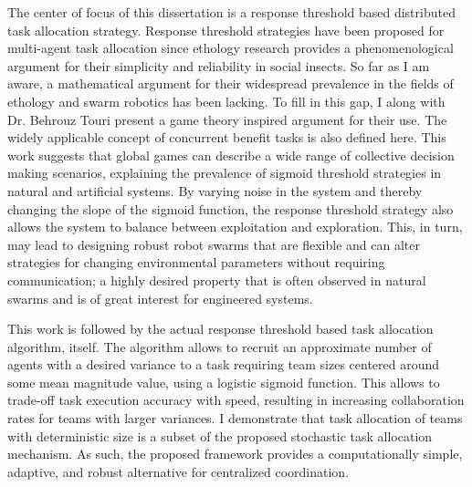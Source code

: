 \documentclass[12pt]{book}
\begin{document}
The center of focus of this dissertation is a response threshold based distributed task allocation strategy. Response threshold strategies have been proposed for multi-agent task allocation since ethology research \cite{Bonabeau1996, Bonabeau1997, Bonabeau1998} provides a phenomenological argument for their simplicity and reliability in social insects. So far as I am aware, a mathematical argument for their widespread prevalence in the fields of ethology and swarm robotics has been lacking. To fill in this gap, I along with Dr. Behrouz Touri present a game theory inspired argument for their use. The widely applicable concept of concurrent benefit tasks is also defined here. This work suggests that global games can describe a wide range of collective decision making scenarios, explaining the prevalence of sigmoid threshold strategies in natural and artificial systems. By varying noise in the system and thereby changing the slope of the sigmoid function, the response threshold strategy also allows the system to balance between exploitation and exploration. This, in turn, may lead to designing robust robot swarms that are flexible and can alter strategies for changing environmental parameters without requiring communication; a highly desired property that is often observed in natural swarms and is of great interest for engineered systems.

This work is followed by the actual response threshold based task allocation algorithm, itself. The algorithm allows to recruit an approximate number of agents with a desired variance to a task requiring team sizes centered around some mean magnitude value, using a logistic sigmoid function. This allows to trade-off task execution accuracy with speed, resulting in increasing collaboration rates for teams with larger variances. I demonstrate that task allocation of teams with deterministic size is a subset of the proposed stochastic task allocation mechanism. As such, the proposed framework provides a computationally simple, adaptive, and robust alternative for centralized coordination. 
\end{document}
